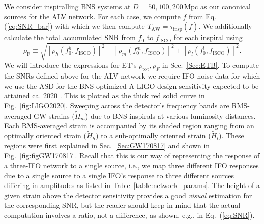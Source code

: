 \documentclass[11pt,a4paper]{article}
\newcommand{\be}{\begin{equation}}
\newcommand{\ee}{\end{equation}}
\begin{document}
%
 We consider inspiralling BNS systems at $D=50,100,200\,$Mpc as our canonical sources for the ALV network.  
 For each case, we compute $\bar{f}$ from Eq.(\ref{eq:SNR_bar}) with which we then compute $T_\text{AW}=\tau_\text{insp}(\bar{f})$.
%
We additionally calculate 
the total accumulated SNR from $f_0$ to $f_\text{ISCO}$ for each inspiral using%
\be
\bar{\rho}_\text{F}\equiv\sqrt{\left[{\rho}_h(f_0^h,{f}_\text{ISCO})\right]^2+\left[{\rho}_m(f_0^m,{f}_\text{ISCO})\right]^2+\left[{\rho}_l(f_0^l,{f}_\text{ISCO})\right]^2} \label{eq:SNR_bar_FINAL} .
\ee
%
%
We will introduce the expressions for ET's $\bar\rho_\text{tot},\bar\rho_F$ in Sec.~\ref{Sec:ETB}.
To compute the SNRs defined above for the ALV network we require IFO noise data for which
we use the ASD for the BNS-optimized A-LIGO design sensitivity expected to be attained ca. 2020 \cite{LIGO2020}. 
This is plotted as the thick red solid curve in Fig.~\ref{fig:LIGO2020}.
Sweeping across the detector's frequency bands are RMS-averaged GW strains ($\tilde{H}_m$) due to BNS inspirals at various luminosity distances.
Each RMS-averaged strain is accompanied by its shaded region ranging from an optimally oriented strain ($\tilde{H}_h$) to a sub-optimally oriented strain ($\tilde{H}_l$). These regions were first explained in Sec.~\ref{Sec:GW170817} and shown in Fig.~\ref{fig:figGW170817}.
Recall that this is our way of representing the response of a three-IFO network to a single source, i.e., we map three different IFO responses due to a single source to a single IFO's response to three different sources differing in amplitudes as listed in Table~\ref{table:network_params}.
The height of a given strain above the detector sensitivity provides a good \emph{visual} estimation for the corresponding SNR,
but the reader should keep in mind that the actual computation involves a ratio, not a difference, as shown, e.g., in Eq.~(\ref{eq:SNR}).
%
%
%
\end{document}
